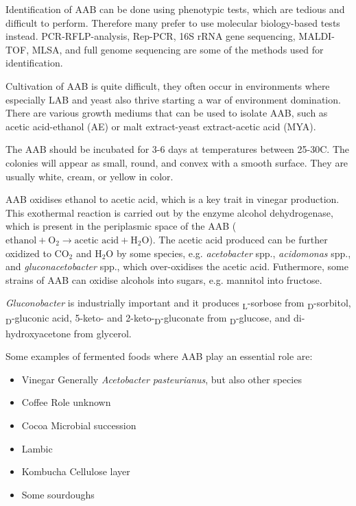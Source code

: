 Identification of AAB can be done using phenotypic tests, which are tedious and difficult to perform. Therefore many prefer to use molecular biology-based tests instead. PCR-RFLP-analysis, Rep-PCR, 16S rRNA gene sequencing, MALDI-TOF, MLSA, and full genome sequencing are some of the methods used for identification.

Cultivation of AAB is quite difficult, they often occur in environments where especially LAB and yeast also thrive starting a war of environment domination. There are various growth mediums that can be used to isolate AAB, such as  acetic acid-ethanol (AE) or malt extract-yeast extract-acetic acid (MYA).

The AAB should be incubated for 3-6 days at temperatures between 25-30\textdegree C. The colonies will appear as small, round, and convex with a smooth surface. They are usually white, cream, or yellow in color.

AAB oxidises ethanol to acetic acid, which is a key trait in vinegar production. This exothermal reaction is carried out by the enzyme alcohol dehydrogenase, which is present in the periplasmic space of the AAB ($\text{ethanol} + \text{O}_2 \rightarrow \text{acetic acid} + \text{H}_2\text{O}$). The acetic acid produced can be further oxidized to $\text{CO}_2$ and $\text{H}_2\text{O}$ by some species, e.g. \textit{acetobacter} spp., \textit{acidomonas} spp., and \textit{gluconacetobacter} spp., which over-oxidises the acetic acid.
Futhermore, some strains of AAB can oxidise alcohols into sugars, e.g. mannitol into fructose. 

\textit{Gluconobacter} is industrially important and it produces \textsubscript{L}-sorbose from \textsubscript{D}-sorbitol, \textsubscript{D}-gluconic acid, 5-keto- and 2-keto-\textsubscript{D}-gluconate from \textsubscript{D}-glucose, and di-hydroxyacetone from glycerol.

Some examples of fermented foods where AAB play an essential role are:
\begin{itemize}
    \item Vinegar
    \subitem Generally \textit{Acetobacter pasteurianus}, but also other species
    \item Coffee
    \subitem Role unknown
    \item Cocoa
    \subitem Microbial succession
    \item Lambic
    \item Kombucha
    \subitem Cellulose layer
    \item Some sourdoughs
\end{itemize}

